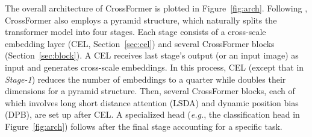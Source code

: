 \documentclass{article} \usepackage{iclr2022_conference,times}
\newcommand{\eg}{{\emph{e.g.}}}
\begin{document}
The overall architecture of CrossFormer is plotted in Figure~\ref{fig:arch}.
Following \citep{DBLP:journals/corr/abs-2102-12122,DBLP:journals/corr/abs-2103-14030,DBLP:journals/corr/abs-2106-05786}, CrossFormer also employs a pyramid structure, which naturally splits the transformer model into four stages.
Each stage consists of a cross-scale embedding layer (CEL, Section~\ref{sec:cel}) and several CrossFormer blocks (Section~\ref{sec:block}).
A CEL receives last stage's output (or an input image) as input and generates cross-scale embeddings.
In this process, CEL (except that in \textit{Stage-1}) reduces the number of embeddings to a quarter while doubles their dimensions for a pyramid structure.
Then, several CrossFormer blocks, each of which involves long short distance attention (LSDA) and dynamic position bias (DPB), are set up after CEL.
A specialized head (\eg, the classification head in Figure~\ref{fig:arch}) follows after the final stage accounting for a specific task.

\vspace{-1mm}
\end{document}
